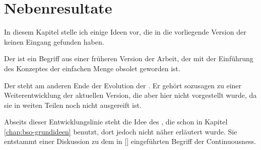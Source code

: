 \chapter{Nebenresultate}\label{chap:nebenresultat}
    In diesem Kapitel stelle ich einige Ideen vor, die in die vorliegende Version der \strukt keinen Eingang gefunden haben.
    
    Der  ist ein Begriff aus einer früheren Version der Arbeit, der mit der Einführung des Konzeptes der einfachen Menge obsolet geworden ist.
    
    Der  steht am anderen Ende der \glqq Evolution der \strukt\grqq.
    Er gehört sozusagen zu einer Weiterentwicklung der aktuellen Version, die aber hier nicht vorgestellt wurde, da sie in weiten Teilen noch nicht ausgereift ist.
    
    Abseits dieser Entwicklungslinie steht die Idee des , die schon in Kapitel \ref{chap:bso-grundideen} benutzt, dort jedoch nicht näher erläutert wurde. 
    Sie entstammt einer Diskussion zu dem in [\cite{baumann-r-2019--a}] eingeführten Begriff der Continuousness.

